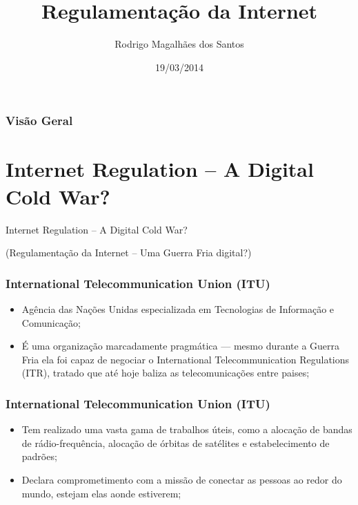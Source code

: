 \documentclass{beamer}
\title[Regulamentação da Internet]{Regulamentação da Internet} %
\author{Rodrigo Magalhães dos Santos} %
\institute[IPT] %
{
Instituto de Pesquisas Tecnológicas \\ Universidade de São Paulo \\ %
\medskip
\textit{rmagalhaes85@gmail.com} %
}
\date{19/03/2014}
\begin{document}
\begin{frame}
\titlepage %
\end{frame}

\begin{frame}
\frametitle{Visão Geral}
\tableofcontents 
\end{frame}


\section{Internet Regulation -- A Digital Cold War?} 

\begin{frame}
\huge{\centerline{Internet Regulation -- A Digital Cold War?}}
\normalsize{\centerline{(Regulamentação da Internet -- Uma Guerra Fria digital?)}}
\end{frame}


\begin{frame}
\frametitle{International Telecommunication Union (ITU)}
\begin{itemize}
\item Agência das Nações Unidas especializada em Tecnologias de Informação e Comunicação;
\item É uma organização marcadamente pragmática --- mesmo durante a Guerra Fria ela foi capaz de negociar o International Telecommunication Regulations (ITR), tratado que até hoje baliza as telecomunicações entre paises;
\end{itemize}
\end{frame}


\begin{frame}
\frametitle{International Telecommunication Union (ITU)}
\begin{itemize}
\item Tem realizado uma vasta gama de trabalhos úteis, como a alocação  de bandas de rádio-frequência, alocação de órbitas de satélites e estabelecimento de padrões;
\item Declara comprometimento com a missão de conectar as pessoas ao redor do mundo, estejam elas aonde estiverem;
\end{itemize}
\end{frame}
\end{document}
